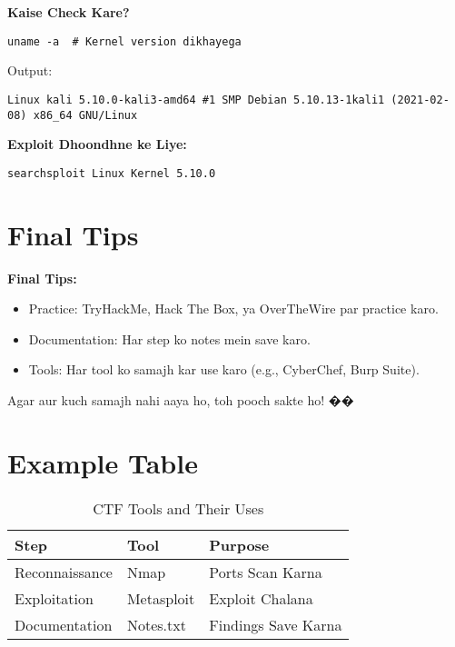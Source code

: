 \documentclass[a4paper]{article}
\begin{document}
\textbf{Kaise Check Kare?} \\
\begin{lstlisting}
uname -a  # Kernel version dikhayega
\end{lstlisting}
Output: \\
\begin{lstlisting}
Linux kali 5.10.0-kali3-amd64 #1 SMP Debian 5.10.13-1kali1 (2021-02-08) x86_64 GNU/Linux  
\end{lstlisting}

\textbf{Exploit Dhoondhne ke Liye:} \\
\begin{lstlisting}
searchsploit Linux Kernel 5.10.0  
\end{lstlisting}

\section{Final Tips}
\textbf{Final Tips:} \\
\begin{itemize}
  \item \textcolor{warningred}{Practice:} TryHackMe, Hack The Box, ya OverTheWire par practice karo.
  \item \textcolor{warningred}{Documentation:} Har step ko notes mein save karo.
  \item \textcolor{warningred}{Tools:} Har tool ko samajh kar use karo (e.g., CyberChef, Burp Suite).
\end{itemize}
Agar aur kuch samajh nahi aaya ho, toh pooch sakte ho! ��

\section{Example Table}
\begin{table}[h]
  \centering
  \begin{tabular}{|C{4cm}|C{4cm}|C{4cm}|}
    \hline
     \color{white} \textbf{Step} & 
     \color{white} \textbf{Tool} & 
     \color{black} \textbf{Purpose} \\
    \hline
    Reconnaissance & Nmap & Ports Scan Karna \\
    \hline
     Exploitation & Metasploit & Exploit Chalana \\
    \hline
    Documentation & Notes.txt & Findings Save Karna \\
    \hline
  \end{tabular}
  \caption{CTF Tools and Their Uses}
\end{table}
\end{document}
